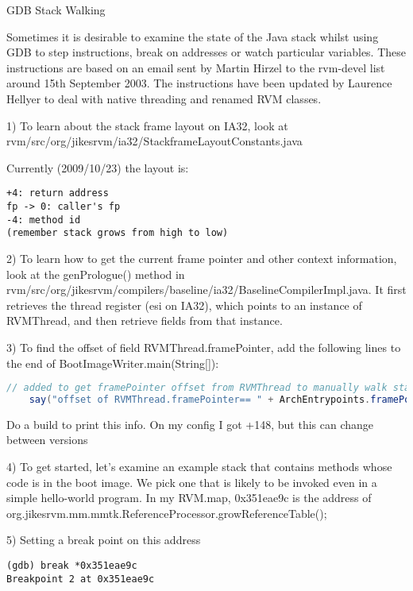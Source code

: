 \begin{section}{GDB Stack Walking}
\label{sec:gdbstackwalking}



Sometimes it is desirable to examine the state of the Java stack whilst using GDB to step instructions, break on addresses or watch particular variables. These instructions are based on an email sent by Martin Hirzel to the rvm-devel list around 15th September 2003. The instructions have been updated by Laurence Hellyer to deal with native threading and renamed RVM classes.

1) To learn about the stack frame layout on IA32, look at rvm/src/org/jikes\-rvm/ia32/Stack\-frame\-Layout\-Constants.java

Currently (2009/10/23) the layout is: 
\begin{lstlisting}
+4: return address
fp -> 0: caller's fp
-4: method id
(remember stack grows from high to low)
\end{lstlisting}

2) To learn how to get the current frame pointer and other context information, look at the genPrologue() method in rvm/src/org/jikesrvm/compilers/baseline/ia32/BaselineCompilerImpl.java. It first retrieves the thread register (esi on IA32), which points to an instance of RVMThread, and then retrieve fields from that instance.

3) To find the offset of field RVMThread.framePointer, add the following lines to the end of BootImageWriter.main(String[]):

\begin{lstlisting}[language=Java]
    // added to get framePointer offset from RVMThread to manually walk stacks in GDB
    say("offset of RVMThread.framePointer== " + ArchEntrypoints.framePointerField.getOffset());
\end{lstlisting}

Do a build to print this info. On my config I got +148, but this can change between versions

4) To get started, let's examine an example stack that contains methods whose code is in the boot image. We pick one that is likely to be invoked even in a simple hello-world program. In my RVM.map, 0x351eae9c is the address of org.jikesrvm.mm.mmtk.ReferenceProcessor.growReferenceTable();

5) Setting a break point on this address

\begin{lstlisting}
(gdb) break *0x351eae9c
Breakpoint 2 at 0x351eae9c
\end{lstlisting}


\end{section}
